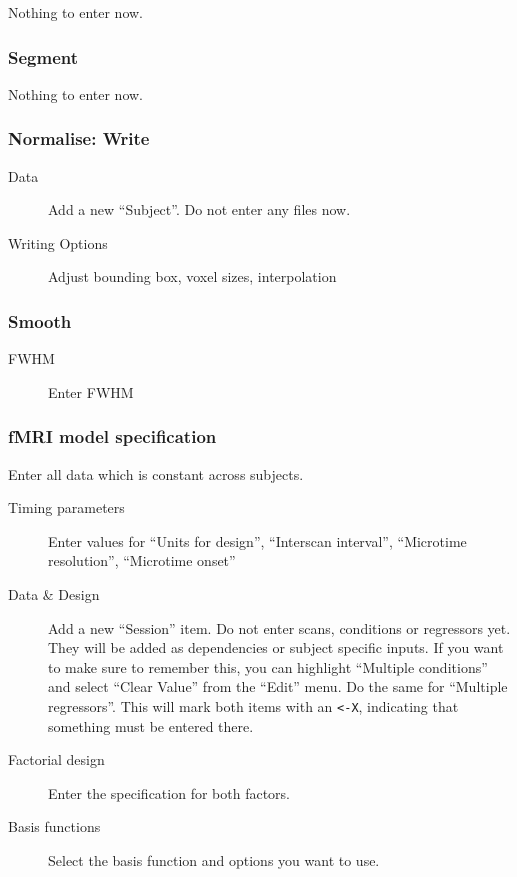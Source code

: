 Nothing to enter now.

\subsubsection*{Segment}

 Nothing to enter now.

\subsubsection*{Normalise: Write}

\begin{description}
\item[Data] Add a new ``Subject''. Do not enter any files now.
\item[Writing Options] Adjust bounding box, voxel sizes, interpolation
\end{description}

\subsubsection*{Smooth}

\begin{description}
\item[FWHM] Enter FWHM
\end{description}

\subsubsection*{fMRI model specification} 

Enter all data which is constant across subjects. 
\begin{description}
\item[Timing parameters] Enter values for ``Units for design'', ``Interscan
  interval'', ``Microtime resolution'', ``Microtime onset''
\item[Data \& Design] Add a new ``Session'' item. Do not enter scans,
  conditions or regressors yet. They will be added as dependencies or
  subject specific inputs. If you want to make sure to remember this, you
  can highlight ``Multiple conditions'' and select ``Clear Value'' from the
  ``Edit'' menu. Do the same for ``Multiple regressors''. This will mark
  both items with an \verb|<-X|, indicating that something must be entered
  there.
\item[Factorial design] Enter the specification for both factors.
\item[Basis functions] Select the basis function and options you want to use.
\end{description}

